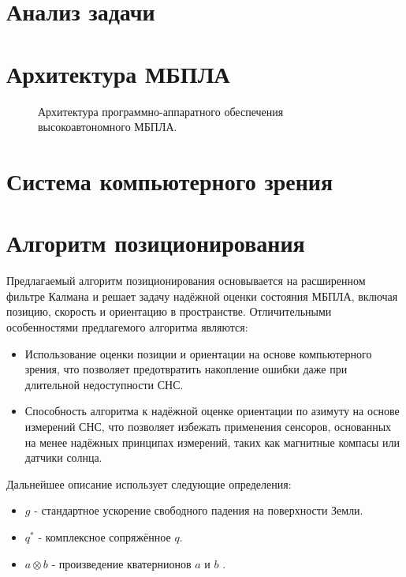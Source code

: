 \documentclass[12pt,a4paper]{article}
\begin{document}
\section{Анализ задачи}



\section{Архитектура МБПЛА}

\begin{figure}[!h]
    \centering
    
    \caption{\label{fig:arch}Архитектура программно-аппаратного обеспечения высокоавтономного МБПЛА.}
\end{figure}



\section{Система компьютерного зрения}



\section{Алгоритм позиционирования}

Предлагаемый алгоритм позиционирования основывается на расширенном фильтре Калмана и решает задачу надёжной оценки состояния МБПЛА, включая позицию, скорость и ориентацию в пространстве. Отличительными особенностями предлагемого алгоритма являются:

\begin{itemize}
    \item Использование оценки позиции и ориентации на основе компьютерного зрения, что позволяет предотвратить накопление ошибки даже при длительной недоступности СНС.
    \item Способность алгоритма к надёжной оценке ориентации по азимуту на основе измерений СНС, что позволяет избежать применения сенсоров, основанных на менее надёжных принципах измерений, таких как магнитные компасы или датчики солнца.
\end{itemize}

Дальнейшее описание использует следующие определения:

\begin{itemize}
    \item $g$ - стандартное ускорение свободного падения на поверхности Земли.
    \item $q^*$ - комплексное сопряжённое $q$.
    \item $a \otimes b$ - произведение кватернионов $a$ и $b$ \cite{QuaternionsMadgwick}.
\end{itemize}
\end{document}

